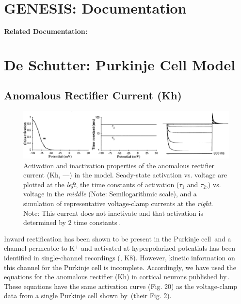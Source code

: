 \documentclass[12pt]{article}
\begin{document}
\section*{GENESIS: Documentation}

{\bf Related Documentation:}

\section*{De Schutter: Purkinje Cell Model}

\subsection*{Anomalous Rectifier Current (Kh)}

\begin{figure}[h]
\centering
   \includegraphics[scale=0.75]{figures/DS1.2D.eps}
   \caption{Activation and inactivation properties of the anomalous rectifier current (Kh, ---) in the model. Seady-state activation vs. voltage are plotted at the {\em left}, the time constants of activation ($\tau_1$ and $\tau_2$,) vs. voltage in the {\em middle} (Note: Semilogarithmic scale), and a simulation of representative voltage-clamp currents at the {\em right}. Note: This current does not inactivate and that activation is determined by 2 time constants\,\cite{Spain-W-J:1987ij}.}
   \label{fig:DS1.2D}
\end{figure}

Inward rectification has been shown to be present in the Purkinje cell\,\cite{Crepel:1986cr, Hounsgaard:1988nx} and a channel permeable to K$^+$ and activated at hyperpolarized potentials has been identified in single-channel recordings (\cite{Gruol:1989oq}, K8). However, kinetic information on this channel for the Purkinje cell is incomplete. Accordingly, we have used the equations for the anomalous rectifier (Kh) in cortical neurons published by\,\cite{Spain-W-J:1987ij}. These equations have the same activation curve (Fig. 20) as the voltage-clamp data from a single Purkinje cell shown by\,\cite{Crepel:1986cr} (their Fig. 2).



\end{document}
